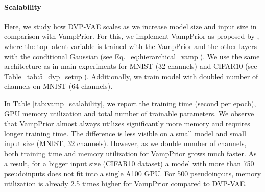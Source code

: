 \paragraph{Scalability}
Here, we study how DVP-VAE scales as we increase model size and input size in comparison with VampPrior.
For this, we implement VampPrior as proposed by \citet{tomczak2018vae}, where the top latent variable is trained with the VampPrior and the other layers with the conditional Gaussian (see Eq.~\ref{eq:hierarchical_vamp}).
 We use the same architecture as in main experiments for MNIST (32 channels) and CIFAR10 (see Table~\ref{tab:5_dvp_setup}). Additionally, we train model with doubled number of channels on MNIST (64 channels).

In Table \ref{tab:vamp_scalability}, we report the training time (second per epoch), GPU memory utilization and total number of trainable parameters. 
We observe that VampPrior almost always utilizes significantly more memory and requires longer training time. The difference is less visible on a small model and small input size (MNIST, 32 channels). However, as we double number of channels, both training time and memory utilization for VampPrior grows much faster. As a result, for a bigger input size (CIFAR10 dataset) a model with more than 750 pseudoinputs does not fit into a single A100 GPU. For 500 pseudoinputs, memory utilization is already 2.5 times higher for VampPrior compared to DVP-VAE.








